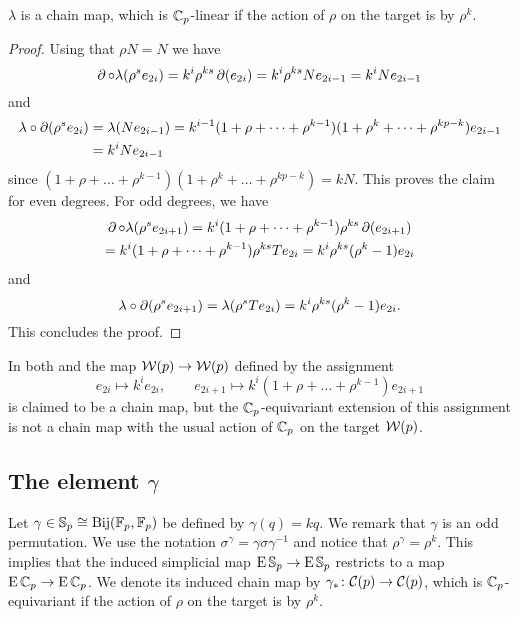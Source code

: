 \begin{lemma}
	$\lambda$ is a chain map, which is $\mathbb{C}_p$-linear if the action of $\rho$ on the target is by $\rho^k$.
\end{lemma}

\begin{proof}
	Using that $\rho N = N$ we have
	\[
	\operatorname{\partial} \mathbin{\circ} \lambda(\rho^s e_{2i}) = k^i \rho^{ks} \operatorname{\partial} (e_{2i}) = k^i \rho^{ks} N e_{2i-1} = k^i N e_{2i-1}
	\]
	and
	\begin{align*}
		\lambda \mathbin{\circ} \operatorname{\partial}(\rho^s e_{2i}) &= \lambda(N e_{2i-1}) = k^{i-1}(1+\rho+\dots+\rho^{k-1}) (1+\rho^k+\dots+\rho^{kp-k}) e_{2i-1} \\ &=
		k^i N e_{2i-1}
	\end{align*}
	since $(1+\rho+\dots+\rho^{k-1}) (1+\rho^k+\dots+\rho^{kp-k}) = kN$.
	This proves the claim for even degrees.
	For odd degrees, we have
	\begin{multline*}
		\operatorname{\partial} \mathbin{\circ} \lambda(\rho^s e_{2i+1}) = k^i (1+\rho+\dots+\rho^{k-1}) \rho^{ks} \operatorname{\partial} (e_{2i+1}) \\
		= k^i (1+\rho+\dots+\rho^{k-1}) \rho^{ks} T e_{2i} = k^i \rho^{ks} (\rho^k-1) e_{2i}
	\end{multline*}
	and
	\[
	\lambda \mathbin{\circ} \operatorname{\partial}(\rho^s e_{2i+1}) = \lambda(\rho^s T e_{2i}) = k^i\rho^{ks}(\rho^k-1) e_{2i}.
	\]
	This concludes the proof.
\end{proof}

\begin{remark*}
	In both \cite[p.219]{steenrod1953cyclic} and \cite[p.159]{may1970general} the map $\mathcal{W}(p) \to \mathcal{W}(p)$ defined by the assignment
	\[
	e_{2i} \mapsto k^i e_{2i}, \qquad
	e_{2i+1} \mapsto k^i (1+\rho+\dots+\rho^{k-1}) e_{2i+1}
	\]
	is claimed to be a chain map, but the $\mathbb{C}_p$-equivariant extension of this assignment is not a chain map with the usual action of $\mathbb{C}_p$ on the target $\mathcal{W}(p)$.
\end{remark*}

\subsection{The element $\gamma$}

Let $\gamma \in \mathbb{S}_p \cong \mathrm{Bij}({\mathbb{F}_p}, {\mathbb{F}_p})$ be defined by $\gamma(q) = kq$.
We remark that $\gamma$ is an odd permutation.
We use the notation $\sigma^\gamma = \gamma \sigma \gamma^{-1}$
and notice that $\rho^\gamma = \rho^k$.
This implies that the induced simplicial map $\operatorname{E}\mathbb{S}_p \to \operatorname{E}\mathbb{S}_p$ restricts to a map $\operatorname{E}\mathbb{C}_p \to \operatorname{E}\mathbb{C}_p$.
We denote its induced chain map by $\gamma_\ast \colon \mathcal{C}(p) \to \mathcal{C}(p)$, which is $\mathbb{C}_p$-equivariant if the action of $\rho$ on the target is by $\rho^k$.

